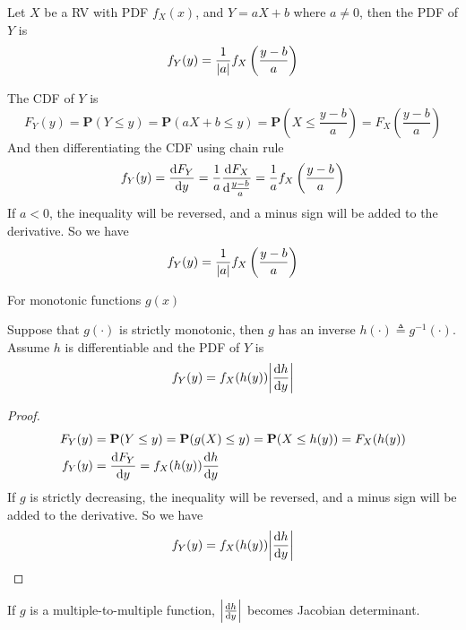 \documentclass[device=normal, lang=en]{elegantbook}
\numberwithin{equation}{section}
\begin{document}
\begin{example}[PDF of $Y = aX+b$]
    Let $X$ be a RV with PDF $f_{X}(x)$, and $Y = aX + b$ where $a \neq 0$, then the PDF of $Y$ is
    \begin{equation}
        f_{Y}(y) = \frac{1}{\abs{a}} f_{X}\left(\frac{y - b}{a}\right)
    \end{equation}
\end{example}
\begin{solution}
    The CDF of $Y$ is
    \begin{equation}
        F_{Y}(y) = \mathbf{P}(Y \leq y) = \mathbf{P}(aX + b \leq y) = \mathbf{P}\left(X \leq \frac{y - b}{a}\right) = F_{X}\left(\frac{y - b}{a}\right)
    \end{equation}
    And then differentiating the CDF using chain rule
    \begin{equation}
        f_{Y}(y) = \dv{F_{Y}}{y} = \frac{1}{a} \dv{F_{X}}{\frac{y - b}{a}} = \frac{1}{a} f_{X}\left(\frac{y - b}{a}\right)
    \end{equation}
    If $a < 0$, the inequality will be reversed, and a minus sign will be added to the derivative. So we have
    \begin{equation}
        f_{Y}(y) = \frac{1}{\abs{a}} f_{X}\left(\frac{y - b}{a}\right)
    \end{equation}
\end{solution}

For monotonic functions $g(x)$
\begin{theorem}
    Suppose that $g(\cdot)$ is strictly monotonic, then $g$ has an inverse $h(\cdot) \triangleq g^{-1}(\cdot)$. Assume $h$ is differentiable and the PDF of $Y$ is
    \begin{equation}
        f_{Y}(y) = f_{X}(h(y)) \abs{\dv{h}{y}}
    \end{equation}
\end{theorem}
\begin{proof}
    \begin{align}
        F_{Y}(y) &= \mathbf{P}(Y \leq y) = \mathbf{P}(g(X) \leq y) = \mathbf{P}(X \leq h(y)) = F_{X}(h(y)) \\ 
        f_{Y}(y) &= \dv{F_{Y}}{y} = f_{X}(h(y)) \dv{h}{y}
    \end{align}
    If $g$ is strictly decreasing, the inequality will be reversed, and a minus sign will be added to the derivative. So we have
    \begin{equation}
        f_{Y}(y) = f_{X}(h(y)) \abs{\dv{h}{y}}
    \end{equation}
\end{proof}
\begin{remark}
    If $g$ is a multiple-to-multiple function, $\abs{\dv{h}{y}}$ becomes Jacobian determinant.
\end{remark}
\end{document}
